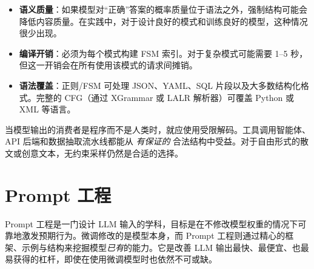\begin{itemize}
  \item \textbf{语义质量}：如果模型对“正确”答案的概率质量位于语法之外，强制结构可能会降低内容质量。在实践中，对于设计良好的模式和训练良好的模型，这种情况很少出现。
  \item \textbf{编译开销}：必须为每个模式构建 FSM 索引。对于复杂模式可能需要 1--5 秒，但这一开销会在所有使用该模式的请求间摊销。
  \item \textbf{语法覆盖}：正则/FSM 可处理 JSON、YAML、SQL 片段以及大多数结构化格式。完整的 CFG（通过 XGrammar 或 LALR 解析器）可覆盖 Python 或 XML 等语言。
\end{itemize}

\begin{keybox}[何时使用受限解码]
当模型输出的消费者是程序而不是人类时，就应使用受限解码。工具调用智能体、API 后端和数据抽取流水线都能从 \emph{有保证的} 合法结构中受益。对于自由形式的散文或创意文本，无约束采样仍然是合适的选择。
\end{keybox}

\section{Prompt 工程}
\label{sec:prompt-engineering}

Prompt 工程是一门设计 LLM 输入的学科，目标是在不修改模型权重的情况下可靠地激发预期行为。微调修改的是模型本身，而 Prompt 工程则通过精心的框架、示例与结构来挖掘模型\emph{已有}的能力。它是改善 LLM 输出最快、最便宜、也最易获得的杠杆，即使在使用微调模型时也依然不可或缺。


